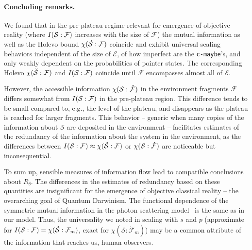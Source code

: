 \documentclass[aps,prl,showpacs,amsmath,amssymb,amsfonts,lengthcheck,twocolumn,longbibliography,superscriptaddress]{revtex4-2}
\newcommand{\cS}        {{\mathcal S}}
\newcommand{\cE}        {{\mathcal E}}
\newcommand{\+}         {\dagger}
\newcommand\cF{{\mathcal F}}
\begin{document}
\paragraph*{Concluding remarks.}
We found that in the pre-plateau regime relevant for emergence of objective reality (where $I({\cal S} : {\cal F})$ increases with the size of $\cF$) the mutual information as well as the Holevo bound $\chi(\check {\cal S} : {\cal F})$ coincide and exhibit universal scaling behaviors independent of the size of $\cE$, of how imperfect are the {\tt c-maybe}'s, and only weakly dependent on the probabilities of pointer states. The corresponding Holevo $\chi(\check {\cal S} : {\cal F})$ and $I({\cal S} : {\cal F})$ coincide until $\cF$ encompasses almost all of $\cE$. 

However, the accessible information $\chi({\cal S} : \check {\cal F})$ in the environment fragments $\cF$ differs somewhat from $I({\cal S} : {\cal F})$ in the pre-plateau region. This difference tends to be small compared to, e.g., the level of the plateau, and disappears as the plateau is reached for larger fragments. This behavior -- generic when many copies of the information about $\cS$ are deposited in the environment -- facilitates estimates of the redundancy of the information about the system in the environment, as the differences between $I({\cal S} : {\cal F}) \approx \chi(\check {\cal S} : {\cal F})$ or $\chi({\cal S}: \check {\cal F})$ are noticeable but inconsequential.

To sum up, sensible measures of information flow lead to compatible conclusions about $R_\delta$. The differences in the estimates of redundancy based on these quantities are insignificant for the emergence of objective classical reality -- the overarching goal of Quantum Darwinism.  The functional dependence of the symmetric mutual information in the photon scattering model~\cite{Riedel2010PRL,Riedel2011NJP} is the same as in our model. Thus, the universality we noted in scaling with $s$ and $p$ (approximate for $I({\cal S} : {\cal F})=\chi (\check \cS: \cF_m) $, exact for $\chi (\cS: \check \cF_m) $) may be a common attribute of the information that reaches us, human observers.




\end{document}
